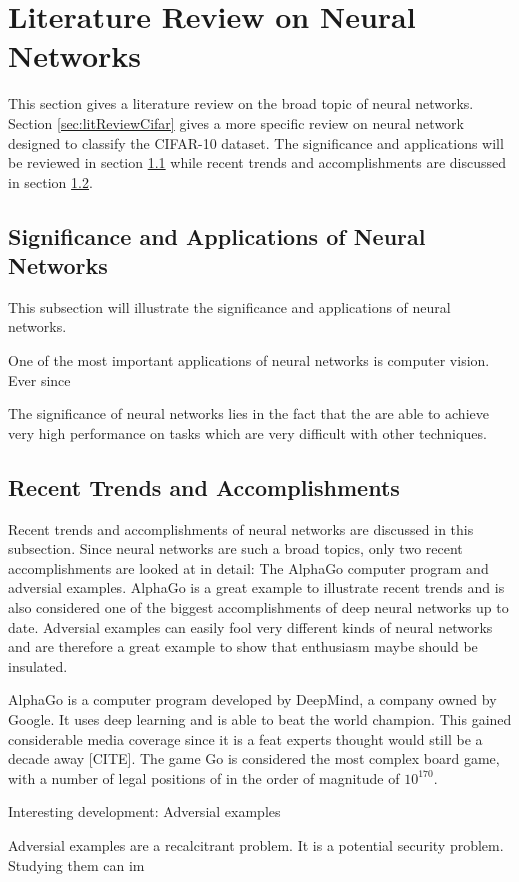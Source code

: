 \section{Literature Review on Neural Networks}
     \pagestyle{mario}
     
This section gives a literature review on the broad topic of neural networks. Section \ref{sec:litReviewCifar} gives a more specific review on neural network designed to classify the CIFAR-10 dataset. The significance and applications will be reviewed in section \ref{subsec:signif} while recent trends and accomplishments are discussed in section \ref{subsec:trends}.

\subsection{Significance and Applications of Neural Networks}\label{subsec:signif}

This subsection will illustrate the significance and applications of neural networks.

One of the most important applications of neural networks is computer vision. Ever since

The significance of neural networks lies in the fact that the are able to achieve very high performance on tasks which are very difficult with other techniques.

\subsection{Recent Trends and Accomplishments}\label{subsec:trends}

Recent trends and accomplishments of neural networks are discussed in this subsection. Since neural networks are such a broad topics, only two recent accomplishments are looked at in detail: The AlphaGo computer program and adversial examples. AlphaGo is a great example to illustrate recent trends and is also considered one of the biggest accomplishments of deep neural networks up to date. Adversial examples can easily fool very different kinds of neural networks and are therefore a great example to show that enthusiasm maybe should be insulated.

AlphaGo is a computer program developed by DeepMind, a company owned by Google. It uses deep learning and is able to beat the world champion. This gained considerable media coverage since it is a feat experts thought would still be a decade away [CITE]. The game Go is considered the most complex board game, with a number of legal positions of in the order of magnitude of $10^{170}$\cite{tromp2006combinatorics}.


\cite{silver2016mastering}
\cite{silver2017mastering}

Interesting development: Adversial examples

Adversial examples are a recalcitrant problem. It is a potential security problem. Studying them can im
\cite{Nguyen_2015_CVPR}
\cite{goodfellow2014explaining}
